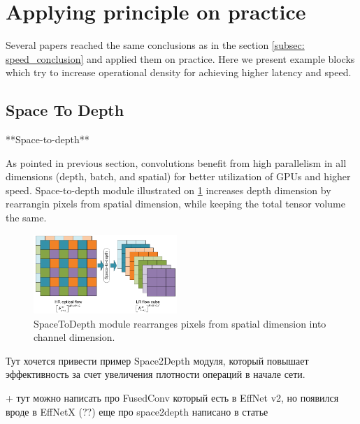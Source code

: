 \section{Applying principle on practice}
Several papers reached the same conclusions as in the section \ref{subsec: speed_conclusion} \cite{li2021_searching} \cite{lin2020neural_genet} and applied them on practice. Here we present example blocks which try to increase operational density for achieving higher latency and speed. 


\subsection{Space To Depth} \label{subsec:space2depth}
**Space-to-depth**  

As pointed in previous section, convolutions benefit from high parallelism in all dimensions (depth, batch, and spatial) for better utilization of GPUs and higher speed. Space-to-depth module illustrated on \ref{fig: space2depth} increases depth dimension by rearrangin pixels from spatial dimension, while keeping the total tensor volume the same. 


\begin{figure}[h]
    \centering
        
        \includegraphics[height=3cm]{images/space2depth.pdf}
    \caption{SpaceToDepth module rearranges pixels from spatial dimension into channel dimension.} 
    \label{fig: space2depth}
    \end{figure}





Тут хочется привести пример Space2Depth модуля, который повышает эффективность за счет увеличения плотности операций в начале сети. 

 + тут можно написать про FusedConv который есть в EffNet v2, но появился вроде в EffNetX (??) 
еще про space2depth написано в статье \cite{ridnik2021_tresnet}


